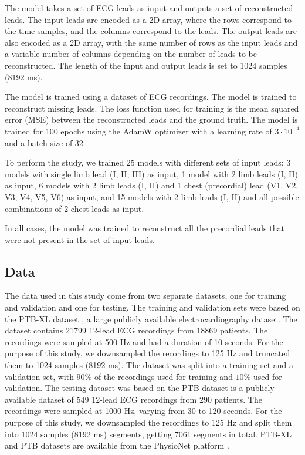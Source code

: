 \documentclass[preprint,12pt]{elsarticle}
\begin{document}
The model takes a set of ECG leads as input and outputs a set of reconstructed leads. The input leads are encoded as a 2D array, where the rows correspond to the time samples, and the columns correspond to the leads. The output leads are also encoded as a 2D array, with the same number of rows as the input leads and a variable number of columns depending on the number of leads to be reconstructed. The length of the input and output leads is set to 1024 samples (8192 ms).

The model is trained using a dataset of ECG recordings. The model is trained to reconstruct missing leads. The loss function used for training is the mean squared error (MSE) between the reconstructed leads and the ground truth. The model is trained for 100 epochs using the AdamW optimizer with a learning rate of $3 \cdot 10^{-4}$ and a batch size of 32.

To perform the study, we trained 25 models with different sets of input leads:
3 models with single limb lead (I, II, III) as input,
1 model with 2 limb leads (I, II) as input,
6 models with 2 limb leads (I, II) and 1 chest (precordial) lead (V1, V2, V3, V4, V5, V6) as input,
and 15 models with 2 limb leads (I, II) and all possible combinations of 2 chest leads as input.

In all cases, the model was trained to reconstruct all the precordial leads that were not present in the set of input leads.

\subsection{Data}

The data used in this study come from two separate datasets, one for training and validation and one for testing. The training and validation sets were based on the PTB-XL dataset \cite{ptbxl1, ptbxl2}, a large publicly available electrocardiography dataset. The dataset contains 21799 12-lead ECG recordings from 18869 patients. The recordings were sampled at 500 Hz and had a duration of 10 seconds. For the purpose of this study, we downsampled the recordings to 125 Hz and truncated them to 1024 samples (8192 ms). The dataset was split into a training set and a validation set, with $90\%$ of the recordings used for training and $10\%$ used for validation. The testing dataset was based on the PTB dataset \cite{ptb} is a publicly available dataset of 549 12-lead ECG recordings from 290 patients. The recordings were sampled at 1000 Hz, varying from 30 to 120 seconds. For the purpose of this study, we downsampled the recordings to 125 Hz and split them into 1024 samples (8192 ms) segments, getting 7061 segments in total. PTB-XL and PTB datasets are available from the PhysioNet platform \cite{physionet}.
\end{document}
